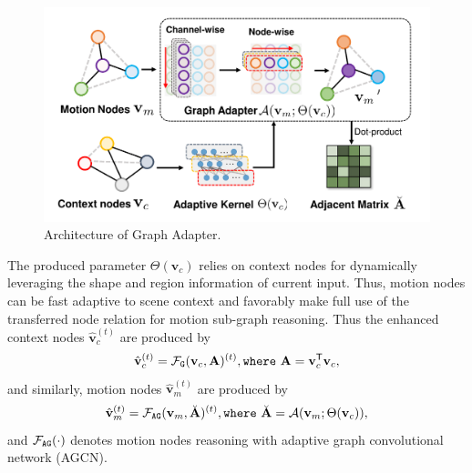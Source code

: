 \documentclass[letterpaper]{article} %
\begin{document}
\begin{figure}[pt]
\begin{center}
\includegraphics[width=1\linewidth]{figs/fig3_crop.pdf}
\end{center}
\caption{Architecture of Graph Adapter.}
\label{fig:3}
\end{figure}

The produced parameter $\Theta({\mathbf v}_c)$ relies on context nodes for dynamically leveraging the shape and region information of current input. Thus, motion nodes can be fast adaptive to scene context and favorably make full use of the transferred node relation for motion sub-graph reasoning.
Thus the enhanced context nodes $\hat{\mathbf v}_c^{(t)}$ are produced by
\begin{equation}
\hat{\mathbf v}_c^{(t)} = {\cal F}_{\tt G}({\mathbf v}_c, {\mathbf A})^{(t)}, {\tt where}~ {\mathbf A} = {\mathbf v}_c^{\mathsf T}{\mathbf v}_c,
\end{equation}
and similarly, motion nodes $\hat{\mathbf v}_m^{(t)}$ are produced by
\begin{equation}
\hat{\mathbf v}_m^{(t)} = {\cal F}_{\tt AG}({\mathbf v}_m, \breve{\mathbf A})^{(t)}, {\tt where}~ \breve{\mathbf A} = {\cal A}({\mathbf v}_m; \Theta({\mathbf v}_c)),
\end{equation}
and ${\cal F}_{\tt AG}(\cdot)$ denotes motion nodes reasoning with adaptive graph convolutional network (AGCN).
\end{document}
